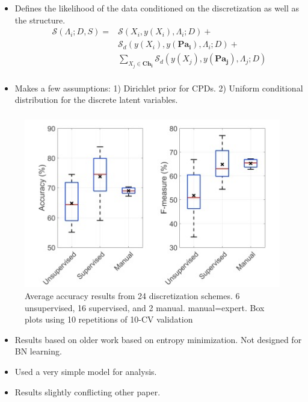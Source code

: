 \documentclass{beamer}
\begin{document}
\begin{frame}
	\frametitle{}
	\begin{itemize}
		\item Defines the likelihood of the data conditioned on the discretization as well as the structure.
			\begin{equation}
				\begin{split}
					\mathcal{S}(\Lambda_i; D, S) =& \mathcal{S}(X_i, y(X_i), \Lambda_i; D) + \\
							    & \mathcal{S}_d(y(X_i), y(\mathbf{Pa_i}), \Lambda_i; D) + \\
							    & \sum_{X_j \in \mathbf{Ch_i}} \mathcal{S}_d(y(X_j), y(\mathbf{Pa_j}), \Lambda_j; D) \\
				\end{split}
			\end{equation}
		\item Makes a few assumptions: 1) Dirichlet prior for CPDs. 2) Uniform conditional distribution for the discrete latent variables.
	\end{itemize}
\end{frame}

\begin{frame}
	\frametitle{}
	\begin{figure}
		\centering
		\includegraphics[scale=0.4]{imgs/disc_empirical.png}
		\caption*{\footnotesize{Average accuracy results from 24 discretization schemes. 6 unsupervised, 16 supervised, and 2 manual. manual=expert. Box plots using 10 repetitions of 10-CV validation}}
	\end{figure}
	\vspace{-1em}
	\begin{itemize}
		\item Results based on older work based on entropy minimization. Not designed for BN learning.
		\item Used a very simple model for analysis.
		\item Results slightly conflicting other paper.
	\end{itemize}
\end{frame}
\end{document}
